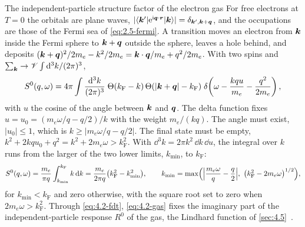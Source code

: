 \begin{workedexample}{The independent-particle structure factor of the electron gas}\label{we:4-gas}
For free electrons at $T = 0$ the orbitals are plane waves, $|\langle\bm{k}'|\mathrm{e}^{\mathrm{i}\bm{q}\cdot\bm{r}}|\bm{k}\rangle| = \delta_{\bm{k}',\bm{k}+\bm{q}}$, and the occupations are those of the Fermi sea of \cref{eq:2.5-fermi}. A transition moves an electron from $\bm{k}$ inside the Fermi sphere to $\bm{k} + \bm{q}$ outside the sphere, leaves a hole behind, and deposits $(\bm{k} + \bm{q})^2/2m_e - k^2/2m_e = \bm{k}\cdot\bm{q}/m_e + q^2/2m_e$. With two spins and $\sum_{\bm{k}} \to \mathscr{V}\int\mathrm{d}^3k/(2\pi)^3$,
\begin{equation*}
  S^0(q,\omega) = 4\pi\int\frac{\mathrm{d}^3k}{(2\pi)^3}\;\Theta(k_{\mathrm{F}} - k)\,\Theta(|\bm{k}+\bm{q}| - k_{\mathrm{F}})\;\delta\!\left(\omega - \frac{kqu}{m_e} - \frac{q^2}{2m_e}\right) ,
\end{equation*}
with $u$ the cosine of the angle between $\bm{k}$ and $\bm{q}$. The delta function fixes $u = u_0 = (m_e\omega/q - q/2)/k$ with the weight $m_e/(kq)$. The angle must exist, $|u_0| \le 1$, which is $k \ge |m_e\omega/q - q/2|$. The final state must be empty, $k^2 + 2kqu_0 + q^2 = k^2 + 2m_e\omega > k_{\mathrm{F}}^2$. With $\dd^3k = 2\pi k^2\,\dd k\,\dd u$, the integral over $k$ runs from the larger of the two lower limits, $k_{\mathrm{min}}$, to $k_{\mathrm{F}}$:
\begin{equation}
  S^0(q,\omega) = \frac{m_e}{\pi q}\int_{k_{\mathrm{min}}}^{k_{\mathrm{F}}}k\,\mathrm{d} k = \frac{m_e}{2\pi q}\bigl(k_{\mathrm{F}}^2 - k_{\mathrm{min}}^2\bigr), \qquad
  k_{\mathrm{min}} = \max\Bigl(\Bigl|\frac{m_e\omega}{q} - \frac{q}{2}\Bigr|,\ \bigl(k_{\mathrm{F}}^2 - 2m_e\omega\bigr)^{1/2}\Bigr) ,
  \label{eq:4.2-gas}
\end{equation}
for $k_{\mathrm{min}} < k_{\mathrm{F}}$ and zero otherwise, with the square root set to zero when $2m_e\omega > k_{\mathrm{F}}^2$. Through \cref{eq:4.2-fdt}, \cref{eq:4.2-gas} fixes the imaginary part of the independent-particle response $R^0$ of the gas, the Lindhard function of \cref{sec:4.5}~\cite{lindhard1954properties}.


\end{workedexample}
